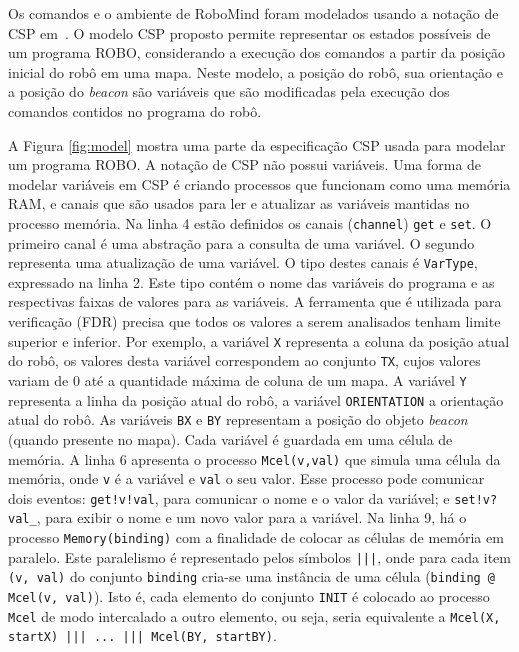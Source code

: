 Os comandos e o ambiente de RoboMind foram modelados usando a notação de CSP em~\cite{nogueira}. O modelo CSP proposto permite representar os estados possíveis de um programa ROBO, considerando a execução dos comandos a partir da posição inicial do robô em uma mapa. Neste modelo, a posição do robô, sua orientação e a posição do \textit{beacon} são variáveis que são modificadas pela execução dos comandos contidos no programa do robô.

A Figura \ref{fig:model} mostra uma parte da especificação CSP usada para modelar um programa ROBO. A notação de CSP não possui variáveis. Uma forma de modelar variáveis em CSP é criando processos que funcionam como uma memória RAM, e canais que são usados para ler e atualizar as variáveis mantidas no processo memória. Na linha 4 estão definidos os canais (\texttt{channel}) \texttt{get} e \texttt{set}. O primeiro canal é uma abstração para a consulta de uma variável. O segundo representa uma atualização de uma variável. O tipo destes canais é \texttt{VarType}, expressado na linha 2. Este tipo contém o nome das variáveis do programa e as respectivas faixas de valores para as variáveis. A ferramenta que é utilizada para verificação (FDR) precisa que todos os valores a serem analisados tenham limite superior e inferior. Por exemplo, a variável \texttt{X} representa a coluna da posição atual do robô, os valores desta variável correspondem ao conjunto \texttt{TX}, cujos valores variam de 0 até a quantidade máxima de coluna de um mapa. A variável \texttt{Y} representa a linha da posição atual do robô, a variável \texttt{ORIENTATION} a orientação atual do robô. As variáveis \texttt{BX} e \texttt{BY} representam a posição do objeto \textit{beacon} (quando presente no mapa). Cada variável é guardada em uma célula de memória. A linha 6 apresenta o processo \texttt{Mcel(v,val)} que simula uma célula da memória, onde \texttt{v} é a variável e \texttt{val} o seu valor. Esse processo pode comunicar dois eventos: \texttt{get!v!val}, para comunicar o nome e o valor da variável; e \texttt{set!v?val\_}, para exibir o nome e um novo valor para a variável. Na linha 9, há o processo \texttt{Memory(binding)} com a finalidade de colocar as células de memória em paralelo. Este paralelismo é representado pelos símbolos \texttt{|||}, onde para cada item \texttt{(v, val)} do conjunto \texttt{binding} cria-se uma instância de uma célula (\texttt{binding @ Mcel(v, val)}). Isto é, cada elemento do conjunto \texttt{INIT} é colocado ao processo \texttt{Mcel} de modo intercalado a outro elemento, ou seja, seria equivalente a \texttt{Mcel(X, startX) ||| ... ||| Mcel(BY, startBY)}.

